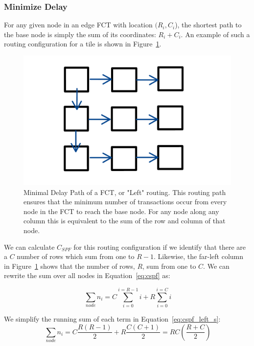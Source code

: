 \subsubsection{Minimize Delay}
\label{sec:min_comm}
For any given node in an edge FCT with location $(R_{i},C_{i}$), the shortest path to the base node is simply the sum of its coordinates: $R_{i}+C_{i}$.
An example of such a routing configuration for a tile is shown in Figure~\ref{fig:leftroute}.

\begin{figure}[]
\centering
\includegraphics[width=\textwidth]{images/leftroute.pdf}
\caption{Minimal Delay Path of a FCT, or "Left" routing.
This routing path ensures that the minimum number of transactions occur from every node in the FCT to reach the base node.
For any node along any column this is equivalent to the sum of the row and column of that node.}
\label{fig:leftroute}
\end{figure}

We can calculate $C_{SPF}$ for this routing configuration if we identify that there are a $C$ number of rows which sum from one to $R-1$.
Likewise, the far-left column in Figure~\ref{fig:leftroute} shows that the number of rows, $R$, sum from one to $C$.
We can rewrite the sum over all nodes in Equation~\ref{eq:cspf} as:

\begin{equation}~\label{eq:cspf_left_s}
  \sum_{node}n_{i} = C\sum_{i=0}^{i=R-1}i + R\sum_{i=0}^{i=C}i
\end{equation}

We simplify the running sum of each term in Equation~\ref{eq:cspf_left_s}:
\begin{equation}~\label{eq:cspf_left_e}
  \sum_{node}n_{i} = C\frac{R(R-1)}{2} + R\frac{C(C+1)}{2} = RC(\frac{R+C}{2})
\end{equation}

